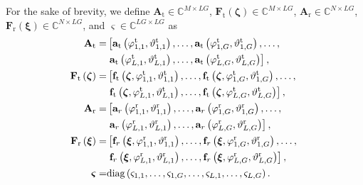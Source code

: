 \documentclass[lettersize,journal]{IEEEtran}
\begin{document}
For the sake of brevity, we define $\mathbf{A}_{\textrm{t}}\in\mathbb{C}^{M\times LG}$, $\mathbf{F}_{\textrm{t}}\left ( \boldsymbol{\zeta} \right )\in\mathbb{C}^{M\times LG}$, $\mathbf{A}_{\textrm{r}}\in\mathbb{C}^{N\times LG}$, $\mathbf{F}_{\textrm{r}}\left ( \boldsymbol{\xi} \right )\in\mathbb{C}^{N\times LG}$, and $\boldsymbol{\varsigma}\in\mathbb{C}^{LG\times LG}$ as
\begin{align}
 \mathbf{A}_{\textrm{t}}=&\left [ \mathbf{a}_{\textrm{t}}\left ( \varphi_{1,1}^{\textrm{t}}, \vartheta_{1,1}^{\textrm{t}} \right ),\ldots ,\mathbf{a}_{\textrm{t}}\left ( \varphi_{1,G}^{\textrm{t}}, \vartheta_{1,G}^{\textrm{t}} \right ),\ldots ,\right. \notag\\
 &\left.\mathbf{a}_{\textrm{t}}\left ( \varphi_{L,1}^{\textrm{t}}, \vartheta_{L,1}^{\textrm{t}} \right ),\ldots ,\mathbf{a}_{\textrm{t}}\left ( \varphi_{L,G}^{\textrm{t}}, \vartheta_{L,G}^{\textrm{t}} \right ) \right ],\\
 \mathbf{F}_{\textrm{t}}\left ( \boldsymbol{\zeta} \right )=&\left [ \mathbf{f}_{\textrm{t}}\left ( \boldsymbol{\zeta}, \varphi_{1,1}^{\textrm{t}}, \vartheta_{1,1}^{\textrm{t}} \right ),\ldots ,\mathbf{f}_{\textrm{t}}\left ( \boldsymbol{\zeta}, \varphi_{1,G}^{\textrm{t}}, \vartheta_{1,G}^{\textrm{t}} \right ),\ldots ,\right. \notag\\
 &\left.\mathbf{f}_{\textrm{t}}\left ( \boldsymbol{\zeta}, \varphi_{L,1}^{\textrm{t}}, \vartheta_{L,1}^{\textrm{t}} \right ),\ldots ,\mathbf{f}_{\textrm{t}}\left ( \boldsymbol{\zeta}, \varphi_{L,G}^{\textrm{t}}, \vartheta_{L,G}^{\textrm{t}} \right ) \right ],\\
 \mathbf{A}_{\textrm{r}}=&\left [ \mathbf{a}_r\left ( \varphi_{1,1}^{\textrm{r}}, \vartheta_{1,1}^{\textrm{r}} \right ),\ldots ,\mathbf{a}_r\left ( \varphi_{1,G}^{\textrm{r}}, \vartheta_{1,G}^{\textrm{r}} \right ),\ldots ,\right. \notag\\
 &\left.\mathbf{a}_r\left ( \varphi_{L,1}^{\textrm{r}}, \vartheta_{L,1}^{\textrm{r}} \right ),\ldots ,\mathbf{a}_r\left ( \varphi_{L,G}^{\textrm{r}}, \vartheta_{L,G}^{\textrm{r}} \right ) \right ],\\
 \mathbf{F}_{\textrm{r}}\left ( \boldsymbol{\xi} \right )=&\left [ \mathbf{f}_r\left ( \boldsymbol{\xi}, \varphi_{1,1}^{\textrm{r}}, \vartheta_{1,1}^{\textrm{r}} \right ),\ldots ,\mathbf{f}_r\left ( \boldsymbol{\xi}, \varphi_{1,G}^{\textrm{r}}, \vartheta_{1,G}^{\textrm{r}} \right ),\ldots ,\right. \notag\\
 &\left.\mathbf{f}_r\left ( \boldsymbol{\xi}, \varphi_{L,1}^{\textrm{r}}, \vartheta_{L,1}^{\textrm{r}} \right ),\ldots ,\mathbf{f}_r\left ( \boldsymbol{\xi}, \varphi_{L,G}^{\textrm{r}}, \vartheta_{L,G}^{\textrm{r}} \right ) \right ],\\
 \boldsymbol{\varsigma }=&\textrm{diag}\left ( \varsigma_{1,1},\ldots ,\varsigma_{1,G},\ldots ,\varsigma_{L,1},\ldots ,\varsigma_{L,G} \right ).
\end{align}
\end{document}
